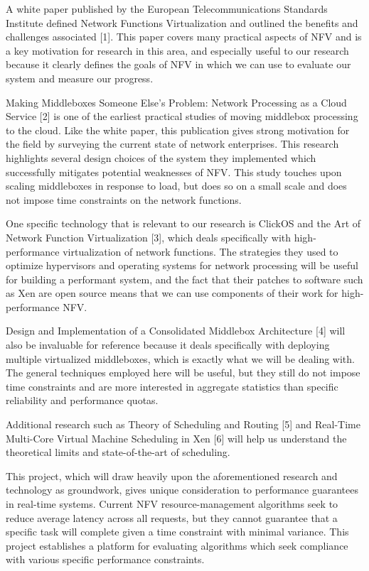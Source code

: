 \documentclass{sig-alternate}
\begin{document}
A white paper published by the European Telecommunications Standards Institute defined Network Functions Virtualization and outlined the benefits and challenges associated [1]. This paper covers many practical aspects of NFV and is a key motivation for research in this area, and especially useful to our research because it clearly defines the goals of NFV in which we can use to evaluate our system and measure our progress.

Making Middleboxes Someone Else’s Problem: Network Processing as a Cloud Service [2] is one of the earliest practical studies of moving middlebox processing to the cloud. Like the white paper, this publication gives strong motivation for the field by surveying the current state of network enterprises. This research highlights several design choices of the system they implemented which successfully mitigates potential weaknesses of NFV. This study touches upon scaling middleboxes in response to load, but does so on a small scale and does not impose time constraints on the network functions.

One specific technology that is relevant to our research is ClickOS and the Art of Network Function Virtualization [3], which deals specifically with high-performance virtualization of network functions. The strategies they used to optimize hypervisors and operating systems for network processing will be useful for building a performant system, and the fact that their patches to software such as Xen are open source means that we can use components of their work for high-performance NFV.

Design and Implementation of a Consolidated Middlebox Architecture [4] will also be invaluable for reference because it deals specifically with deploying multiple virtualized middleboxes, which is exactly what we will be dealing with. The general techniques employed here will be useful, but they still do not impose time constraints and are more interested in aggregate statistics than specific reliability and performance quotas.

Additional research such as Theory of Scheduling and Routing [5] and Real-Time Multi-Core Virtual Machine Scheduling in Xen [6] will help us understand the theoretical limits and state-of-the-art of scheduling.

This project, which will draw heavily upon the aforementioned research and technology as groundwork, gives unique consideration to performance guarantees in real-time systems. Current NFV resource-management algorithms seek to reduce average latency across all requests, but they cannot guarantee that a specific task will complete given a time constraint with minimal variance. This project establishes a platform for evaluating algorithms which seek compliance with various specific performance constraints.
\end{document}
